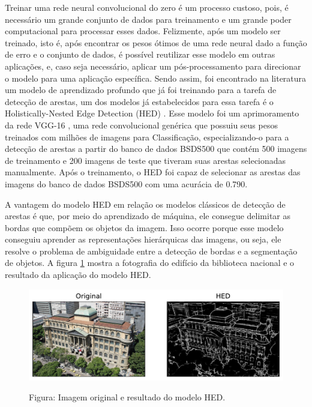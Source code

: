 \documentclass[12pt]{article}
\begin{document}
Treinar uma rede neural convolucional do zero é um processo custoso, pois, é necessário um grande conjunto de dados para treinamento e um grande poder computacional para processar esses dados. Felizmente, após um modelo ser treinado, isto é, após encontrar os pesos ótimos de uma rede neural dado a função de erro e o conjunto de dados, é possível reutilizar esse modelo em outras aplicações, e, caso seja necessário, aplicar um pós-processamento para direcionar o modelo para uma aplicação específica. Sendo assim, foi encontrado na literatura um modelo de aprendizado profundo que já foi treinando para a tarefa de detecção de arestas, um dos modelos já estabelecidos para essa tarefa é o Holistically-Nested Edge Detection (HED) \cite{xie2015holisticallynested}. Esse modelo foi um aprimoramento da rede VGG-16 \cite{VGG16}, uma rede convolucional genérica que possuiu seus pesos treinados com milhões de imagens para Classificação, especializando-o para a detecção de arestas a partir do banco de dados BSDS500 \cite{BSDS500} que contém 500 imagens de treinamento e 200 imagens de teste que tiveram suas arestas selecionadas manualmente. Após o treinamento, o HED foi capaz de selecionar as arestas das imagens do banco de dados BSDS500 com uma acurácia de 0.790.

A vantagem do modelo HED em relação os modelos clássicos de detecção de arestas é que, por meio do aprendizado de máquina, ele consegue delimitar as bordas que compõem os objetos da imagem. Isso ocorre porque esse modelo conseguiu aprender as representações hierárquicas das imagens, ou seja, ele resolve o problema de ambiguidade entre a detecção de bordas e a segmentação de objetos. A figura \ref{fig:hed} mostra a fotografia do edifício da biblioteca nacional e o resultado da aplicação do modelo HED.

\begin{figure}[H]
\centering
\includegraphics[scale=0.75]{bib_hed.pdf}
\label{fig:hed}
\begin{center}
Figura: Imagem original e resultado do modelo HED.
\end{center}
\end{figure}
\end{document}
